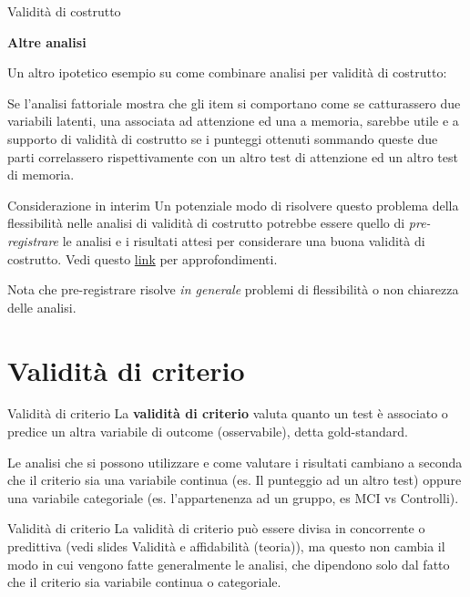 \documentclass[
  ignorenonframetext,
]{beamer}
\begin{document}
\begin{frame}{Validità di costrutto}
\label{validituxe0-di-costrutto-23}
\begin{center}
  \textbf{Altre analisi}
\end{center}
\vspace{2em}

Un altro ipotetico esempio su come combinare analisi per validità di
costrutto:

Se l'analisi fattoriale mostra che gli item si comportano come se
catturassero due variabili latenti, una associata ad attenzione ed una a
memoria, sarebbe utile e a supporto di validità di costrutto se i
punteggi ottenuti sommando queste due parti correlassero rispettivamente
con un altro test di attenzione ed un altro test di memoria.
\end{frame}

\begin{frame}{Considerazione in interim}
\label{considerazione-in-interim}
Un potenziale modo di risolvere questo problema della flessibilità nelle
analisi di validità di costrutto potrebbe essere quello di
\emph{pre-registrare} le analisi e i risultati attesi per considerare
una buona validità di costrutto. Vedi questo
\href{https://en.wikipedia.org/wiki/Preregistration_(science)}{link} per
approfondimenti.

Nota che pre-registrare risolve \emph{in generale} problemi di
flessibilità o non chiarezza delle analisi.
\end{frame}

\section{Validità di criterio}\label{validituxe0-di-criterio}

\begin{frame}{Validità di criterio}
\label{validituxe0-di-criterio-1}
La \textbf{validità di criterio} valuta quanto un test è associato o
predice un altra variabile di outcome (osservabile), detta
gold-standard.

Le analisi che si possono utilizzare e come valutare i risultati
cambiano a seconda che il criterio sia una variabile continua (es. Il
punteggio ad un altro test) oppure una variabile categoriale (es.
l'appartenenza ad un gruppo, es MCI vs Controlli).
\end{frame}

\begin{frame}{Validità di criterio}
\label{validituxe0-di-criterio-2}
La validità di criterio può essere divisa in concorrente o predittiva
(vedi slides Validità e affidabilità (teoria)), ma questo non cambia il
modo in cui vengono fatte generalmente le analisi, che dipendono solo
dal fatto che il criterio sia variabile continua o categoriale.
\end{frame}
\end{document}
